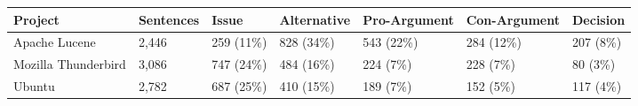 \documentclass[a4paper,12pt,twoside]{report}
\begin{document}
\begin{table}  %
    \centering
    \begin{adjustbox}{max width=\columnwidth}
    \def\arraystretch{1} %
    \begin{tabular}{p{4cm} p{2cm} p{2cm} p{3cm} p{2cm} p{2cm} p{2cm}}
        \toprule
        \textbf{Project} & \textbf{Sentences} & \textbf{Issue} & \textbf{Alternative} & \textbf{Pro-Argument}  & \textbf{Con-Argument}  & \textbf{Decision} \\
        \midrule
			Apache Lucene & 2,446 & 259 (11\%) & 828 (34\%)  & 543 (22\%) & 284 (12\%) & 207 (8\%)\\
			Mozilla Thunderbird & 3,086 & 747 (24\%) & 484 (16\%) & 224 (7\%) & 228 (7\%) & 80 (3\%)\\ 
			Ubuntu & 2,782 & 687 (25\%) & 410 (15\%) & 189 (7\%) & 152 (5\%) & 117 (4\%)\\
        \midrule
    \end{tabular}
    \end{adjustbox}
    \label{tab:distroMultiRationale}
\end{table}
\end{document}
